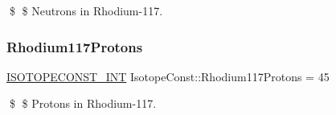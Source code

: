 \$ \$ Neutrons in Rhodium-\/117. \mbox{\label{group___isotope_const-_rhodium-_rh117_ga0ff22eeec3d2a799dd008fab423cb314}} 
\subsubsection{\texorpdfstring{Rhodium117\+Protons}{Rhodium117Protons}}
{\footnotesize\ttfamily \mbox{\hyperlink{group___isotope_const-_macros_ga5f18360b3e99483a35c32d789e62621c}{I\+S\+O\+T\+O\+P\+E\+C\+O\+N\+S\+T\+\_\+\+I\+NT}} Isotope\+Const\+::\+Rhodium117\+Protons = 45}

\$ \$ Protons in Rhodium-\/117. 